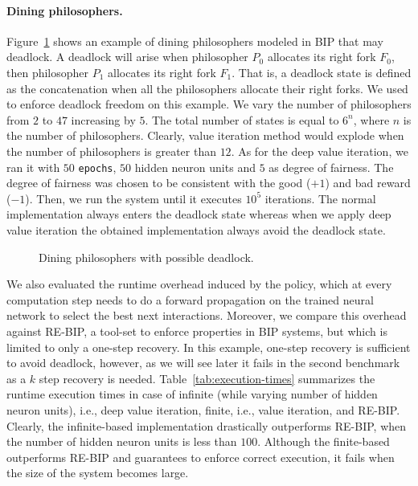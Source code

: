 \paragraph{Dining philosophers.} Figure~\ref{fig:diningbench} shows an example of dining philosophers modeled in BIP that may deadlock. A deadlock will arise when philosopher $P_0$ allocates its right fork $F_0$, then philosopher $P_1$ allocates its right fork $F_1$. That is, a deadlock state is defined as the concatenation when all the philosophers allocate their right forks. We used \rerl to enforce deadlock freedom on this example. We vary the number of philosophers from $2$ to $47$ increasing by $5$. The total number of states is equal to $6^{n}$, where $n$ is the number of philosophers. 
Clearly, value iteration method would explode when the number of philosophers is greater than $12$. 
%
As for the deep value iteration, we ran it with $50$ \texttt{epochs}, $50$ hidden neuron units and $5$ as degree of fairness. The degree of fairness was chosen to be consistent with the good ($+1$) and bad reward ($-1$). Then, we run the system until it executes $10^5$ iterations. The normal implementation always enters the deadlock state whereas when we apply deep value iteration the obtained implementation always avoid the deadlock state.  
%
\begin{figure}[t]
\centering
{}
\caption{Dining philosophers with possible deadlock.}
\label{fig:diningbench}
\end{figure}
%
We also evaluated the runtime overhead induced by the policy, which at every computation step needs to do a forward propagation on the trained neural network to select the best next interactions. Moreover, we compare this overhead against RE-BIP, a tool-set to enforce properties in BIP systems, but which is limited to only a one-step recovery. In this example, one-step recovery is sufficient to avoid deadlock, however, as we will see later it fails in the second benchmark as a $k$ step recovery is needed. Table~\ref{tab:execution-times} summarizes the runtime execution times in case of infinite (while varying number of hidden neuron units), i.e., deep value iteration, finite, i.e., value iteration, and RE-BIP. Clearly, the infinite-based implementation drastically outperforms RE-BIP, when the number of hidden neuron units is less than $100$. Although the finite-based outperforms RE-BIP and guarantees to enforce correct execution, it fails when the size of the system becomes large.  
